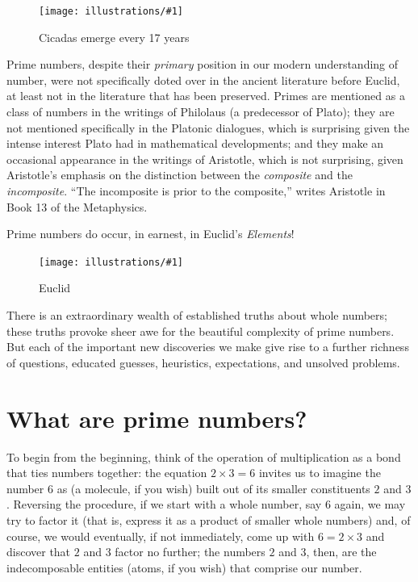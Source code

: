 \documentclass[openany]{book}
\newcommand{\ill}[3]{%
   \begin{figure}[H]%
   \vspace{-2ex}
   \centering%
   \texttt{[image: illustrations/\#1]}%
   \caption{#3}%
   \vspace{-2ex}
    \end{figure}}
\theoremstyle{plain}
\theoremstyle{definition}
\begin{document}
\ill{cicada}{.3}{Cicadas emerge every 17 years}




Prime numbers, despite their {\em primary} position in our modern
understanding of number, were not specifically doted over in the
ancient literature before Euclid, at least not in the literature that
has been preserved. Primes are mentioned as a class of numbers in the
writings of Philolaus (a predecessor of Plato); they are not mentioned
specifically in the Platonic dialogues, which is surprising
given the intense interest Plato had in mathematical developments; and
they make an occasional appearance in the writings of Aristotle, which
is not surprising, given Aristotle's emphasis on the distinction
between the {\em composite} and the {\em incomposite}. ``The
incomposite is prior to the composite,'' writes Aristotle in Book 13 of
the Metaphysics.


Prime numbers do occur, in earnest, in  Euclid's  {\it Elements}!


\ill{euclid}{.3}{Euclid}


There is an extraordinary wealth of established truths about whole
numbers; these truths provoke sheer awe for the beautiful complexity
of prime numbers. But each of the important new discoveries we make
give rise to a further richness of questions, educated guesses,
heuristics, expectations, and unsolved problems.








\chapter{What are prime numbers?}\label{ch:what_are_primes}

 To begin from the beginning, think
of the operation of multiplication as a bond that ties numbers
together: the equation $2\times 3= 6$ invites us to imagine the number
$6$ as (a molecule, if you wish) built out of its smaller constituents
$2$ and $3$.  Reversing the procedure, if we start with a whole
number, say $6$ again, we may try to factor it (that is, express it as
a product of smaller whole numbers) and, of course, we would
eventually, if not immediately, come up with $6 = 2\times 3$ and
discover that $2$ and $3$ factor no further; the numbers $2$ and $3$,
then, are the indecomposable entities (atoms, if you wish) that
comprise our number.
\end{document}
